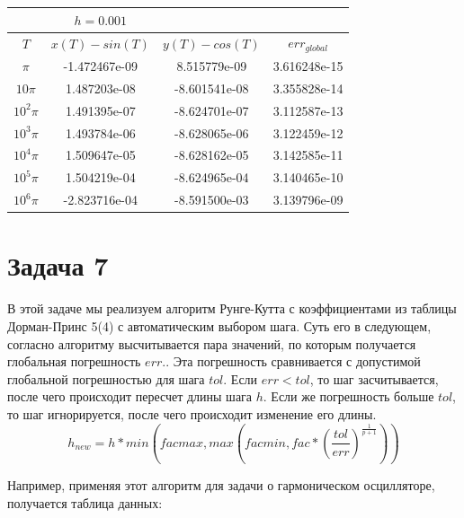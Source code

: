 \documentclass[a4paper,12pt]{article}
\begin{document}
    \begin{table}[htb]
      \begin{center}
        \begin{tabular}{|c|c|c|c|}
			\hline
			&$h=0.001$&&\\
			\hline
			$T$&$x(T)-sin(T)$&$y(T)-cos(T)$&$err_{global}$\\
			\hline
			$\pi$&-1.472467e-09&8.515779e-09&3.616248e-15\\
			\hline
			$10\pi$&1.487203e-08&-8.601541e-08&3.355828e-14\\
			\hline
			$10^2\pi$&1.491395e-07&-8.624701e-07&3.112587e-13\\
			\hline
			$10^3\pi$&1.493784e-06&-8.628065e-06&3.122459e-12\\
			\hline
			$10^4\pi$&1.509647e-05&-8.628162e-05&3.142585e-11\\
			\hline
			$10^5\pi$&1.504219e-04&-8.624965e-04&3.140465e-10\\
			\hline
			$10^6\pi$&-2.823716e-04&-8.591500e-03&3.139796e-09\\
			\hline
        \end{tabular}
      \end{center}
    \end{table}
    \FloatBarrier

	\section*{Задача 7}
	В этой задаче мы реализуем алгоритм Рунге-Кутта с коэффициентами из таблицы  Дорман-Принс 5(4) с автоматическим выбором шага.
	Суть его в следующем, согласно алгоритму высчитывается пара значений, по которым получается глобальная погрешность $err.$. Эта погрешность сравнивается с допустимой глобальной погрешностью для шага $tol.$  Если $err<tol$, то шаг засчитывается, после чего происходит пересчет длины шага $h$. Если же погрешность больше $tol$, то шаг игнорируется, после чего происходит изменение его длины.
	\[h_{new}=h*min(facmax,max(facmin,fac*( \frac{tol}{err})^{\frac{1}{p+1}} ))\]

	Например, применяя этот алгоритм для задачи о гармоническом осцилляторе, получается таблица данных:
\end{document}
